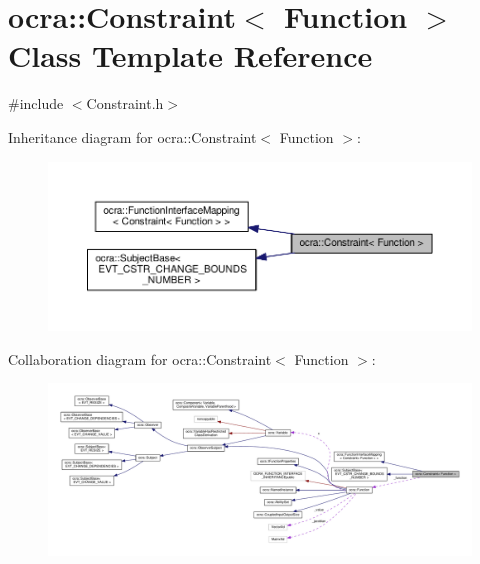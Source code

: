 \hypertarget{classocra_1_1Constraint_3_01Function_01_4}{}\section{ocra\+:\+:Constraint$<$ Function $>$ Class Template Reference}
\label{classocra_1_1Constraint_3_01Function_01_4}


{\ttfamily \#include $<$Constraint.\+h$>$}



Inheritance diagram for ocra\+:\+:Constraint$<$ Function $>$\+:
\nopagebreak
\begin{figure}[H]
\begin{center}
\leavevmode
\includegraphics[width=350pt]{d8/d55/classocra_1_1Constraint_3_01Function_01_4__inherit__graph}
\end{center}
\end{figure}


Collaboration diagram for ocra\+:\+:Constraint$<$ Function $>$\+:
\nopagebreak
\begin{figure}[H]
\begin{center}
\leavevmode
\includegraphics[width=350pt]{d6/dca/classocra_1_1Constraint_3_01Function_01_4__coll__graph}
\end{center}
\end{figure}
